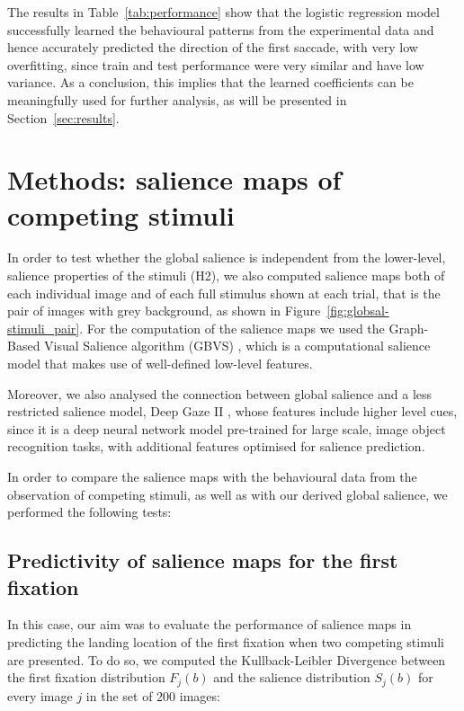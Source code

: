 {The results in Table~\ref{tab:performance} show that the logistic regression model successfully learned the behavioural patterns from the experimental data and hence accurately predicted the direction of the first saccade, with very low overfitting, since train and test performance were very similar and have low variance. As a conclusion, this implies that the learned coefficients can be meaningfully used for further analysis, as will be presented in Section~\ref{sec:results}.

\section{Methods: salience maps of competing stimuli}
\label{sec:locsal}

In order to test whether the global salience is independent from the lower-level, salience properties of the stimuli (H2), we also computed salience maps both of each individual image and of each full stimulus shown at each trial, that is the pair of images with grey background, as shown in Figure~\ref{fig:globsal-stimuli_pair}.  For the computation of the salience maps we used the Graph-Based Visual Salience algorithm (GBVS) \citep{harel2007gbvs}, which is a computational salience model that makes use of well-defined low-level features.

Moreover, we also analysed the connection between global salience and a less restricted salience model, Deep Gaze II \citep{kuemmerer2016deepgaze}, whose features include higher level cues, since it is a deep neural network model pre-trained for large scale, image object recognition tasks, with additional features optimised for salience prediction.

In order to compare the salience maps with the behavioural data from the observation of competing stimuli, as well as with our derived global salience, we performed the following tests:

\subsection{Predictivity of salience maps for the first fixation}
\label{sec:locsal-firstfix}

In this case, our aim was to evaluate the performance of salience maps in predicting the landing location of the first fixation when two competing stimuli are presented. To do so, we computed the Kullback-Leibler Divergence between the first fixation distribution $F_{j}(b)$ and the salience distribution $S_{j}(b)$ for every image $j$ in the set of 200 images:

}
